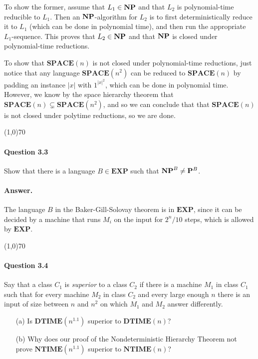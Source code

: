 To show the former, assume that $L_1\in\mathbf{NP}$ and that $L_2$ is polynomial-time reducible to $L_1$. Then an $\mathbf{NP}$-algorithm for $L_2$ is to first deterministically reduce it to $L_1$ (which can be done in polynomial time), and then run the appropriate $L_1$-sequence. This proves that $L_2\in\mathbf{NP}$ and that $\mathbf{NP}$ is closed under polynomial-time reductions.

To show that $\mathbf{SPACE}(n)$ is not closed under polynomial-time reductions, just notice that any language $\mathbf{SPACE}(n^2)$ can be reduced to $\mathbf{SPACE}(n)$ by padding an instance $|x|$ with $1^{|x|^2}$, which can be done in polynomial time. However, we know by the space hierarchy theorem that $\mathbf{SPACE}(n)\subsetneq\mathbf{SPACE}(n^2)$, and so we can conclude that that $\mathbf{SPACE}(n)$ is not closed under polytime reductions, so we are done.

\begin{center}
	\line(1,0){70}
\end{center}

\paragraph{Question 3.3} Show that there is a language $B\in\mathbf{EXP}$ such that $\mathbf{NP}^B\neq\mathbf{P}^B$.

\paragraph{Answer.} The language $B$ in the Baker-Gill-Solovay theorem is in $\mathbf{EXP}$, since it can be decided by a machine that runs $M_i$ on the input for $2^n/10$ steps, which is allowed by $\mathbf{EXP}$.

\begin{center}
	\line(1,0){70}
\end{center}

\paragraph{Question 3.4} Say that a class $C_1$ is \textit{superior} to a class $C_2$ if there is a machine $M_1$ in class $C_1$ such that for every machine $M_2$ in class $C_2$ and every large enough $n$ there is an input of size between $n$ and $n^2$ on which $M_1$ and $M_2$ answer differently.
\begin{enumerate}
	\item[(a)] Is $\mathbf{DTIME}(n^{1.1})$ superior to $\mathbf{DTIME}(n)$?
	\item[(b)] Why does our proof of the Nondeterministic Hierarchy Theorem not prove $\mathbf{NTIME}(n^{1.1})$ superior to $\mathbf{NTIME}(n)$?
\end{enumerate}

